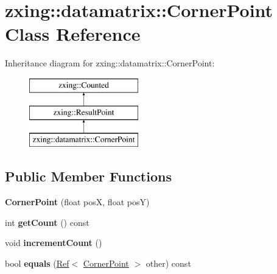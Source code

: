\hypertarget{classzxing_1_1datamatrix_1_1_corner_point}{}\section{zxing\+:\+:datamatrix\+:\+:Corner\+Point Class Reference}
\label{classzxing_1_1datamatrix_1_1_corner_point}
Inheritance diagram for zxing\+:\+:datamatrix\+:\+:Corner\+Point\+:\begin{figure}[H]
\begin{center}
\leavevmode
\includegraphics[height=3.000000cm]{classzxing_1_1datamatrix_1_1_corner_point}
\end{center}
\end{figure}
\subsection*{Public Member Functions}
\begin{DoxyCompactItemize}
\item 
\mbox{\label{classzxing_1_1datamatrix_1_1_corner_point_a30eab6251b03d885ef35475de087baf6}} 
{\bfseries Corner\+Point} (float posX, float posY)
\item 
\mbox{\label{classzxing_1_1datamatrix_1_1_corner_point_a43da136f77abea66c350ca65313c7a02}} 
int {\bfseries get\+Count} () const
\item 
\mbox{\label{classzxing_1_1datamatrix_1_1_corner_point_a376cda341d11ffaca4de4577835ad4c1}} 
void {\bfseries increment\+Count} ()
\item 
\mbox{\label{classzxing_1_1datamatrix_1_1_corner_point_adcb1d76303453aff649dc0549e9e28d4}} 
bool {\bfseries equals} (\mbox{\hyperlink{classzxing_1_1_ref}{Ref}}$<$ \mbox{\hyperlink{classzxing_1_1datamatrix_1_1_corner_point}{Corner\+Point}} $>$ other) const
\end{DoxyCompactItemize}
